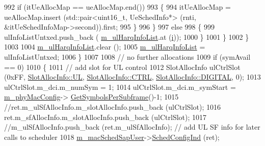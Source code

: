 \begin{DoxyCode}
992                                         \textcolor{keywordflow}{if} (itUeAllocMap == ueAllocMap.end())
993                                         \{
994                                                 itUeAllocMap = ueAllocMap.insert (std::pair<uint16\_t,
       UeSchedInfo*> (rnti, &itUeSchedInfoMap->second)).first;
995                                         \}
996                                 \}
997                                 \textcolor{keywordflow}{else}
998                                 \{
999                                         ulInfoListUntxed.push\_back (
      \hyperlink{classns3_1_1MmWaveFlexTtiMaxRateMacScheduler_a686a92955acbcdcde854c36eb9aaf82d}{m\_ulHarqInfoList}.at (\hyperlink{bernuolliDistribution_8m_a6f6ccfcf58b31cb6412107d9d5281426}{i}));
1000                                 \}
1001                         \}
1002                 \}
1003 
1004                 \hyperlink{classns3_1_1MmWaveFlexTtiMaxRateMacScheduler_a686a92955acbcdcde854c36eb9aaf82d}{m\_ulHarqInfoList}.clear ();
1005                 \hyperlink{classns3_1_1MmWaveFlexTtiMaxRateMacScheduler_a686a92955acbcdcde854c36eb9aaf82d}{m\_ulHarqInfoList} = ulInfoListUntxed;
1006         \}
1007 
1008         \textcolor{comment}{// no further allocations}
1009         \textcolor{keywordflow}{if} (symAvail == 0)
1010         \{
1011                 \textcolor{comment}{// add slot for UL control}
1012                 SlotAllocInfo ulCtrlSlot (0xFF, \hyperlink{structns3_1_1SlotAllocInfo_a6cad60db1d39034f1851e2cea625fe5da916b5be54594ead6ed677c570311cad2}{SlotAllocInfo::UL}, 
      \hyperlink{structns3_1_1SlotAllocInfo_a3ea7cb503bfd0c9a4df55a71b81b9331ad78b7d76ef82d56c33be1fa9c1867409}{SlotAllocInfo::CTRL}, \hyperlink{structns3_1_1SlotAllocInfo_adcbd067d82be6260b3399167d8f0b4eca47a67c342db658a08ded9ce4b49417ea}{SlotAllocInfo::DIGITAL}, 0);
1013                 ulCtrlSlot.m\_dci.m\_numSym = 1;
1014                 ulCtrlSlot.m\_dci.m\_symStart = \hyperlink{classns3_1_1MmWaveMacScheduler_a24d7af4971d2e500fe543cefbafa2fd9}{m\_phyMacConfig}->
      \hyperlink{classns3_1_1MmWavePhyMacCommon_a2fe835b76e3c689defa413e395cd10cb}{GetSymbolsPerSubframe}()-1;
1015                 \textcolor{comment}{//ret.m\_ulSfAllocInfo.m\_slotAllocInfo.push\_back (ulCtrlSlot);}
1016                 ret.m\_sfAllocInfo.m\_slotAllocInfo.push\_back (ulCtrlSlot);
1017                 \textcolor{comment}{//m\_ulSfAllocInfo.push\_back (ret.m\_ulSfAllocInfo); // add UL SF info for later calls to
       scheduler}
1018                 \hyperlink{classns3_1_1MmWaveFlexTtiMaxRateMacScheduler_a5cbf24eeaf560ea4a132bf967e80f817}{m\_macSchedSapUser}->\hyperlink{classns3_1_1MmWaveMacSchedSapUser_ac164dd52215c3924cf421b56089eece4}{SchedConfigInd} (ret);

\end{DoxyCode}

